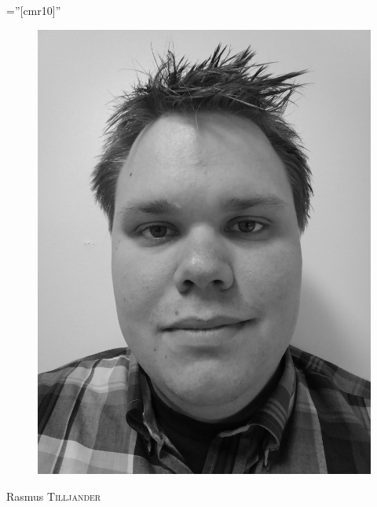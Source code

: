 \documentclass[a4paper,10pt]{article}
\begin{document}

\pagestyle{empty} %

\font\fb=''[cmr10]'' %

\par{	
    
    \begin{figure}
    \includegraphics[scale=0.04]{Grayscale.pdf}
    \end{figure}
    
    \Huge Rasmus \textsc{Tilljander}
	\bigskip
\par}
	
\end{document}
